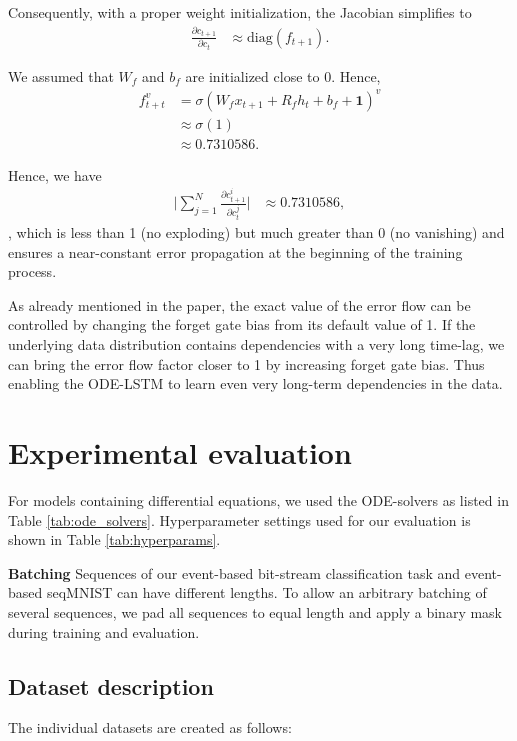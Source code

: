 \documentclass{article}
\begin{document}
Consequently, with a proper weight initialization, the Jacobian simplifies to 
\begin{align*}
\frac{\partial c_{t+1}}{\partial c_t} &\approx \text{diag}(f_{t+1}).
\end{align*}

We assumed that $W_f$ and $b_f$ are initialized close to 0. Hence,
\begin{align*}
    f_{t+t}^v & = \sigma(W_f x_{t+1} + R_f h_{t} + b_f + \mathbf{1})^v \\
    & \approx \sigma(1) \\
    & \approx 0.7310586.
\end{align*}

Hence, we have 
\begin{align*}
\Big| \sum_{j=1}^{N} \frac{\partial c_{t+1}^i}{\partial c_t^j}\Big| & \approx 0.7310586,
\end{align*}
,  which is less than 1 (no exploding) but much greater than 0 (no vanishing) and 
ensures a near-constant error propagation at the beginning of the training process.

As already mentioned in the paper, the exact value of the error flow can be controlled by changing the forget gate bias from its default value of 1.
If the underlying data distribution contains dependencies with a very long time-lag, we can bring the error flow factor closer to 1 by increasing forget gate bias. Thus enabling the ODE-LSTM to learn even very long-term dependencies in the data.

\section{Experimental evaluation}
For models containing differential equations, we used the ODE-solvers as listed in Table \ref{tab:ode_solvers}. Hyperparameter settings used for our evaluation is shown in Table \ref{tab:hyperparams}. 

\textbf{Batching}
Sequences of our event-based bit-stream classification task and event-based seqMNIST can have different lengths.
To allow an arbitrary batching of several sequences, we pad all sequences to equal length and apply a binary mask during training and evaluation.

\subsection{Dataset description}
The individual datasets are created as follows:
\end{document}
